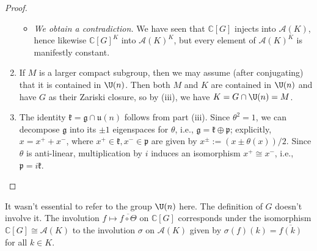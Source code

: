 \documentclass[reqno]{amsart} 
\begin{document}
\begin{proof}
\begin{enumerate}
\begin{itemize}
    \item \emph{We obtain a contradiction.}  We have seen that $\mathbb{C}[G]$ injects into $\mathcal{A}(K)$, hence likewise $\mathbb{C}[G]^K$ into $\mathcal{A}(K)^K$, but every element of $\mathcal{A}(K)^K$ is manifestly constant.
    \end{itemize}
  \item If $M$ is a larger compact subgroup, then we may assume (after conjugating) that it is contained in $\U(n)$.  Then both $M$ and $K$ are contained in $\U(n)$ and have $G$ as their Zariski closure, so by (iii), we have $K = G \cap \U(n) = M$.
  \item The identity $\mathfrak{k} = \mathfrak{g} \cap \mathfrak{u}(n)$ follows from part (iii).  Since $\theta^2 = 1$, we can decompose $\mathfrak{g}$ into its $\pm 1$ eigenspaces for $\theta$, i.e., $\mathfrak{g} = \mathfrak{k} \oplus \mathfrak{p}$; explicitly, $x = x^+ + x^-$, where $x^+ \in \mathfrak{k}, x^- \in \mathfrak{p}$ are given by $x^{\pm} := (x \pm \theta (x))/2$.  Since $\theta$ is anti-linear, multiplication by $i$ induces an isomorphism $x^+ \cong x^-$, i.e., $\mathfrak{p} = i \mathfrak{k}$.
  \end{enumerate}
\end{proof}

\begin{remark}\label{rmk:theta-vs-sigma}
  It wasn't essential to refer to the group $\U(n)$ here.  The definition of $G$ doesn't involve it.  The involution $f \mapsto \overline{f \circ \Theta}$ on $\mathbb{C}[G]$ corresponds under the isomorphism $\mathbb{C}[G] \cong \mathcal{A}(K)$ to the involution $\sigma$ on $\mathcal{A}(K)$ given by $\sigma(f)(k) = \overline{f(k)}$ for all $k \in K$.
\end{remark}
\end{document}
